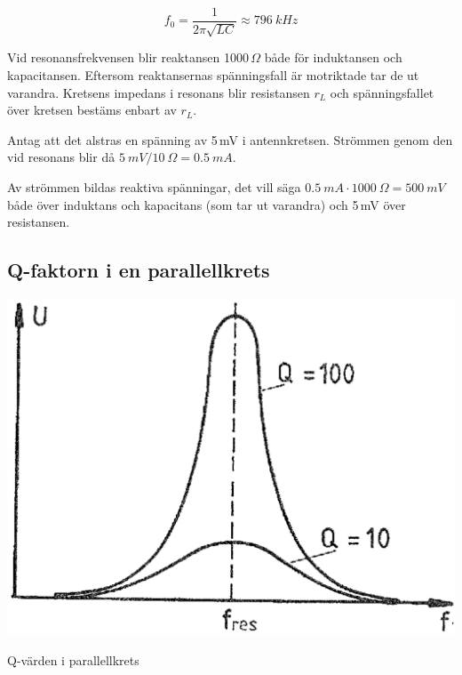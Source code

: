 \[
f_0 = \frac{1}{2\pi \sqrt{LC}} \approx \SI{796}{kHz}
\]

Vid resonansfrekvensen blir reaktansen 1000\,\(\Omega\) både för induktansen och
kapacitansen.
Eftersom reaktansernas spänningsfall är motriktade tar de ut varandra.
Kretsens impedans i resonans blir resistansen \(r_L\) och
spänningsfallet över kretsen bestäms enbart av \(r_L\).

Antag att det alstras en spänning av 5\,mV i antennkretsen.
Strömmen genom den vid resonans blir då \(\SI{5}{mV}/\SI{10}{\Omega}=
\SI{0,5}{mA}\).

Av strömmen bildas reaktiva spänningar, det vill säga
\(\SI{0,5}{mA} \cdot 1000\ \Omega = \SI{500}{mV}\) både över induktans och 
kapacitans (som tar ut varandra) och 5\,mV över resistansen.

\subsection{Q-faktorn i en parallellkrets}
\label{Q-faktor}

\begin{marginfigure}
	\includegraphics[width=\textwidth]{images/cropped_pdfs/bild_2_3-20.pdf}
	\caption{Q-värden i parallellkrets}
	\label{fig:BildII3-20}
\end{marginfigure}


